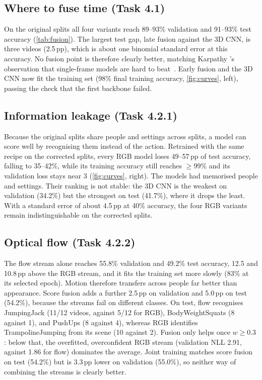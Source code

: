 \subsection{Where to fuse time (Task 4.1)}
On the original splits all four variants reach 89--93\% validation and
91--93\% test accuracy (\cref{tab:fusion}). The largest test gap, late fusion
against the 3D CNN, is three videos (2.5\,pp), which is about one binomial
standard error at this accuracy. No fusion point is therefore clearly better,
matching Karpathy \etal's observation that single-frame models are hard to
beat~\cite{karpathy2014largescale}. Early fusion and the 3D CNN now fit the
training set (98\% final training accuracy, \cref{fig:curves}, left),
passing the check that the first backbone failed.

\subsection{Information leakage (Task 4.2.1)}
Because the original splits share people and settings across splits, a
model can score well by recognising them instead of the action. Retrained with the same recipe on the corrected splits, every RGB model loses
49--57\,pp of test accuracy, falling to 35--42\%, while its training
accuracy still reaches ${\geq}99\%$ and its validation loss stays near 3
(\cref{fig:curves}, right). The models had
memorised people and settings. Their ranking is not stable: the 3D CNN is
the weakest on validation (34.2\%) but the strongest on test (41.7\%), where
it drops the least. With a standard error of about 4.5\,pp at 40\% accuracy,
the four RGB variants remain indistinguishable on the corrected splits.

\subsection{Optical flow (Task 4.2.2)}
The flow stream alone reaches 55.8\% validation and 49.2\% test accuracy,
12.5 and 10.8\,pp above the RGB stream, and it fits the training set more
slowly (83\% at its selected epoch). Motion therefore transfers across
people far better than appearance. Score fusion adds a further 2.5\,pp on
validation and 5.0\,pp on test (54.2\%), because the streams fail on
different classes. On test, flow recognises JumpingJack (11/12 videos,
against 5/12 for RGB), BodyWeightSquats (8 against 1), and PushUps
(8 against 4), whereas RGB identifies TrampolineJumping from its scene
(10 against 2). Fusion only helps once $w\geq0.3$: below that, the
overfitted, overconfident RGB stream (validation NLL 2.91, against 1.86 for
flow) dominates the average. Joint training matches score fusion on test
(54.2\%) but is 3.3\,pp lower on validation (55.0\%), so neither way of
combining the streams is clearly better.
